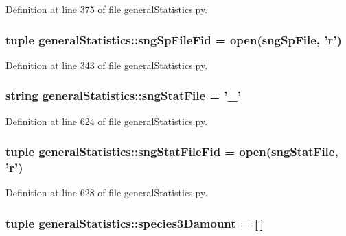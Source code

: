 \-Definition at line 375 of file general\-Statistics.\-py.

\hypertarget{namespacegeneral_statistics_abc048a358e184e9fb3b68f18c254a5f0}{
\subsubsection[{sng\-Sp\-File\-Fid}]{\setlength{\rightskip}{0pt plus 5cm}tuple {\bf general\-Statistics\-::sng\-Sp\-File\-Fid} = open(sng\-Sp\-File, '{\bf r}')}}\label{namespacegeneral_statistics_abc048a358e184e9fb3b68f18c254a5f0}


\-Definition at line 343 of file general\-Statistics.\-py.

\hypertarget{namespacegeneral_statistics_a2b6dc22bc04220d81b7bb62826f0a5ad}{
\subsubsection[{sng\-Stat\-File}]{\setlength{\rightskip}{0pt plus 5cm}string {\bf general\-Statistics\-::sng\-Stat\-File} = '{\bf \-\_\-}'}}\label{namespacegeneral_statistics_a2b6dc22bc04220d81b7bb62826f0a5ad}


\-Definition at line 624 of file general\-Statistics.\-py.

\hypertarget{namespacegeneral_statistics_aa6bcf857bdf3f6f2f12ca093f0e59297}{
\subsubsection[{sng\-Stat\-File\-Fid}]{\setlength{\rightskip}{0pt plus 5cm}tuple {\bf general\-Statistics\-::sng\-Stat\-File\-Fid} = open({\bf sng\-Stat\-File}, '{\bf r}')}}\label{namespacegeneral_statistics_aa6bcf857bdf3f6f2f12ca093f0e59297}


\-Definition at line 628 of file general\-Statistics.\-py.

\hypertarget{namespacegeneral_statistics_a717d9bbd4459fc3d0c6d358cdbdc3287}{
\subsubsection[{species3\-Damount}]{\setlength{\rightskip}{0pt plus 5cm}tuple {\bf general\-Statistics\-::species3\-Damount} = \mbox{[}$\,$\mbox{]}}}\label{namespacegeneral_statistics_a717d9bbd4459fc3d0c6d358cdbdc3287}


